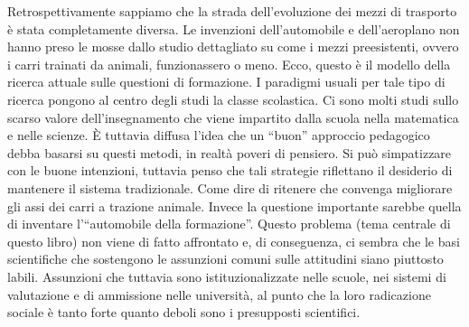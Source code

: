Retrospettivamente sappiamo che la strada dell'evoluzione dei mezzi di trasporto è stata completamente diversa. Le invenzioni dell'automobile e dell'aeroplano non hanno preso le mosse dallo studio dettagliato su come i mezzi preesistenti, ovvero i carri trainati da animali, funzionassero o meno.  Ecco, questo è il  modello della ricerca attuale sulle questioni di formazione. I paradigmi usuali per tale tipo di ricerca pongono al centro degli  studi  la classe scolastica. Ci sono molti studi sullo scarso valore dell'insegnamento che viene impartito dalla scuola nella matematica e nelle scienze. È tuttavia diffusa l'idea che un “buon” approccio pedagogico debba basarsi su questi metodi, in realtà poveri di pensiero. Si può simpatizzare con le buone intenzioni, tuttavia penso che tali strategie riflettano il desiderio di mantenere il sistema tradizionale. Come dire di ritenere che convenga migliorare gli assi dei carri a trazione animale. Invece la questione importante sarebbe quella di inventare l'“automobile della formazione”. Questo problema (tema centrale di questo libro) non viene di fatto affrontato e, di conseguenza, ci sembra che le basi scientifiche che sostengono le assunzioni comuni sulle attitudini siano piuttosto labili. Assunzioni che tuttavia sono istituzionalizzate nelle scuole, nei sistemi di valutazione e di ammissione nelle università, al punto che la loro radicazione sociale è tanto forte quanto deboli sono i presupposti scientifici.

